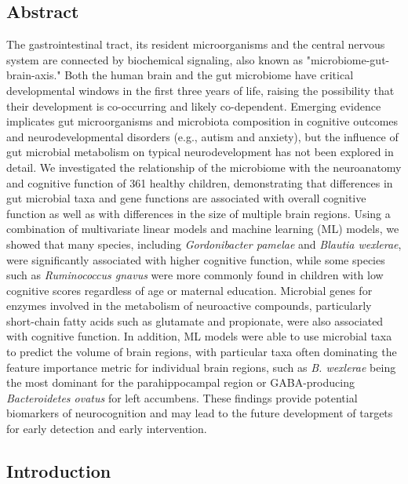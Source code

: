 \documentclass[
]{article}
\begin{document}
\hypertarget{abstract}{%
\subsection{Abstract}\label{abstract}}

The gastrointestinal tract, its resident microorganisms and the central
nervous system are connected by biochemical signaling, also known as
"microbiome-gut-brain-axis." Both the human brain and the gut microbiome
have critical developmental windows in the first three years of life,
raising the possibility that their development is co-occurring and
likely co-dependent. Emerging evidence implicates gut microorganisms and
microbiota composition in cognitive outcomes and neurodevelopmental
disorders (e.g., autism and anxiety), but the influence of gut microbial
metabolism on typical neurodevelopment has not been explored in detail.
We investigated the relationship of the microbiome with the neuroanatomy
and cognitive function of 361 healthy children, demonstrating that
differences in gut microbial taxa and gene functions are associated with
overall cognitive function as well as with differences in the size of
multiple brain regions. Using a combination of multivariate linear
models and machine learning (ML) models, we showed that many species,
including \emph{Gordonibacter pamelae} and \emph{Blautia wexlerae}, were
significantly associated with higher cognitive function, while some
species such as \emph{Ruminococcus gnavus} were more commonly found in
children with low cognitive scores regardless of age or maternal
education. Microbial genes for enzymes involved in the metabolism of
neuroactive compounds, particularly short-chain fatty acids such as
glutamate and propionate, were also associated with cognitive function.
In addition, ML models were able to use microbial taxa to predict the
volume of brain regions, with particular taxa often dominating the
feature importance metric for individual brain regions, such as \emph{B.
wexlerae} being the most dominant for the parahippocampal region or
GABA-producing \emph{Bacteroidetes ovatus} for left accumbens. These
findings provide potential biomarkers of neurocognition and may lead to
the future development of targets for early detection and early
intervention.

\hypertarget{introduction}{%
\subsection{Introduction}\label{introduction}}
\end{document}
